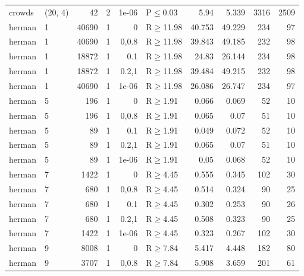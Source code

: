 \begin{longtable}{llrrrlrrrr}
 crowds        & (20, 4)  &     	42 &   2 & 1e-06 & P$\leq$0.03  & 5.94    & 5.339    & 3316   & 2509   \\
 herman        & 1        &  	40690 &   1 & 0     & R$\geq$11.98 & 40.753  & 49.229   & 234    & 97     \\
 herman        & 1        &  	40690 &   1 & 0,0.8 & R$\geq$11.98 & 39.843  & 49.185   & 232    & 98     \\
 herman        & 1        &  	18872 &   1 & 0.1   & R$\geq$11.98 & 24.83   & 26.144   & 234    & 98     \\
 herman        & 1        &  	18872 &   1 & 0.2,1 & R$\geq$11.98 & 39.484  & 49.215   & 232    & 98     \\
 herman        & 1        &  	40690 &   1 & 1e-06 & R$\geq$11.98 & 26.086  & 26.747   & 234    & 97     \\
 herman        & 5        &    	196 &   1 & 0     & R$\geq$1.91  & 0.066   & 0.069    & 52     & 10     \\
 herman        & 5        &    	196 &   1 & 0,0.8 & R$\geq$1.91  & 0.065   & 0.07     & 51     & 10     \\
 herman        & 5        &     	89 &   1 & 0.1   & R$\geq$1.91  & 0.049   & 0.072    & 52     & 10     \\
 herman        & 5        &     	89 &   1 & 0.2,1 & R$\geq$1.91  & 0.065   & 0.07     & 51     & 10     \\
 herman        & 5        &     	89 &   1 & 1e-06 & R$\geq$1.91  & 0.05    & 0.068    & 52     & 10     \\
 herman        & 7        &   	1422 &   1 & 0     & R$\geq$4.45  & 0.555   & 0.345    & 102    & 30     \\
 herman        & 7        &    	680 &   1 & 0,0.8 & R$\geq$4.45  & 0.514   & 0.324    & 90     & 25     \\
 herman        & 7        &    	680 &   1 & 0.1   & R$\geq$4.45  & 0.302   & 0.253    & 90     & 26     \\
 herman        & 7        &    	680 &   1 & 0.2,1 & R$\geq$4.45  & 0.508   & 0.323    & 90     & 25     \\
 herman        & 7        &   	1422 &   1 & 1e-06 & R$\geq$4.45  & 0.323   & 0.267    & 102    & 30     \\
 herman        & 9        &   	8008 &   1 & 0     & R$\geq$7.84  & 5.417   & 4.448    & 182    & 80     \\
 herman        & 9        &   	3707 &   1 & 0,0.8 & R$\geq$7.84  & 5.908   & 3.659    & 201    & 61     \\

\end{longtable}
